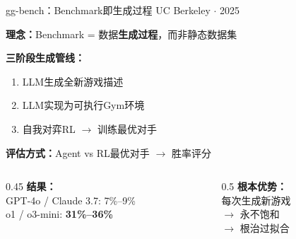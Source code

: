 \documentclass[aspectratio=169, 11pt]{beamer}
\begin{document}
\begin{frame}{gg-bench：Benchmark即生成过程}
{\small UC Berkeley $\cdot$ 2025}

\vspace{6pt}
\textbf{理念：}Benchmark = 数据\textbf{生成过程}，而非静态数据集

\vspace{8pt}
\textbf{三阶段生成管线：}
\begin{enumerate}
    \item LLM生成全新游戏描述
    \item LLM实现为可执行Gym环境
    \item 自我对弈RL $\rightarrow$ 训练最优对手
\end{enumerate}

\vspace{8pt}
\textbf{评估方式：}Agent vs RL最优对手 $\rightarrow$ 胜率评分

\vspace{8pt}
\begin{columns}[T]
\begin{column}{0.45\textwidth}
\small
\textbf{结果：}\\
GPT-4o / Claude 3.7: \alert{7\%--9\%}\\
o1 / o3-mini: \textbf{31\%--36\%}
\end{column}
\begin{column}{0.5\textwidth}
\small
\textbf{根本优势：}\\
每次生成新游戏\\
$\rightarrow$ 永不饱和\\
$\rightarrow$ \alert{根治过拟合}
\end{column}
\end{columns}
\end{frame}
\end{document}

